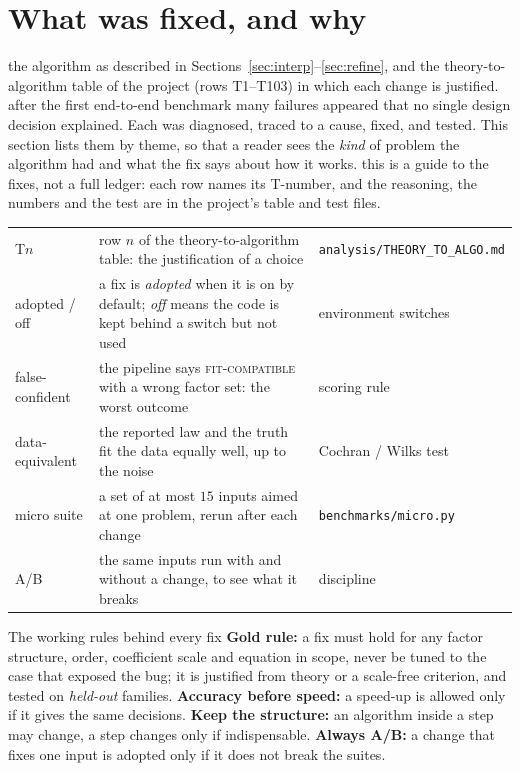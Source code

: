 \section{What was fixed, and why}\label{sec:fixes}
\sectionbrief
{the algorithm as described in Sections~\ref{sec:interp}--\ref{sec:refine}, and the theory-to-algorithm table of the project (rows T1--T103) in which each change is justified.}
{after the first end-to-end benchmark many failures appeared that no single design decision explained. Each was diagnosed, traced to a cause, fixed, and tested. This section lists them by theme, so that a reader sees the \emph{kind} of problem the algorithm had and what the fix says about how it works.}
{this is a guide to the fixes, not a full ledger: each row names its T-number, and the reasoning, the numbers and the test are in the project's table and test files.}

\begin{symbols}
\begin{tabular}{@{}L{2.6cm}L{6.0cm}L{4.3cm}@{}}
T$n$ & row $n$ of the theory-to-algorithm table: the justification of a choice & \texttt{analysis/THEORY\_TO\_ALGO.md}\\
adopted / off & a fix is \emph{adopted} when it is on by default; \emph{off} means the code is kept behind a switch but not used & environment switches\\
false-confident & the pipeline says \textsc{fit-compatible} with a wrong factor set: the worst outcome & scoring rule\\
data-equivalent & the reported law and the truth fit the data equally well, up to the noise & Cochran / Wilks test\\
micro suite & a set of at most $15$ inputs aimed at one problem, rerun after each change & \texttt{benchmarks/micro.py}\\
A/B & the same inputs run with and without a change, to see what it breaks & discipline\\
\end{tabular}
\end{symbols}

\begin{notebox}{The working rules behind every fix}
\textbf{Gold rule:} a fix must hold for any factor structure, order, coefficient scale and equation in scope, never be tuned to the case that exposed the bug; it is justified from theory or a scale-free criterion, and tested on \emph{held-out} families. \textbf{Accuracy before speed:} a speed-up is allowed only if it gives the same decisions. \textbf{Keep the structure:} an algorithm inside a step may change, a step changes only if indispensable. \textbf{Always A/B:} a change that fixes one input is adopted only if it does not break the suites.
\end{notebox}

